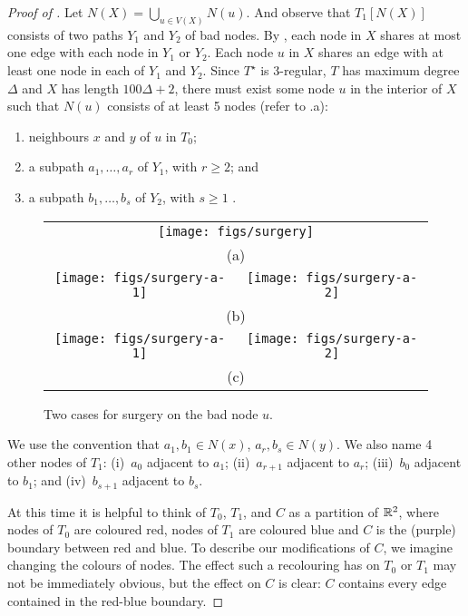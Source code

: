 \documentclass{patmorin}
\newcommand{\dual}[1]{{#1}^\star}
\begin{document}
\begin{proof}[Proof of ]
Let $N(X)=\bigcup_{u\in V(X)} N(u)$.  And observe that
$T_1[N(X)]$ consists of two paths $Y_1$ and $Y_2$ of bad nodes.
By , each node in $X$ shares at most one edge
with each node in $Y_1$ or $Y_2$.  Each node $u$ in $X$ shares an edge
with at least one node in each of $Y_1$ and $Y_2$.  Since $\dual{T}$
is 3-regular, $T$ has maximum degree $\Delta$ and $X$ has length
$100\Delta+2$, there must exist some node $u$ in the interior of $X$
such that $N(u)$ consists of at least 5 nodes (refer to .a):
\begin{enumerate}
   \item neighbours $x$ and $y$ of $u$ in $T_0$;
   \item a subpath $a_1,\ldots,a_r$ of $Y_1$, with $r\ge 2$; and
   \item a subpath $b_1,\ldots,b_s$ of $Y_2$, with $s\ge 1$ \enspace .
\end{enumerate}
\begin{figure}
   \begin{center}
   \begin{tabular}{cc}
    \multicolumn{2}{c}{\texttt{[image: figs/surgery]}} \\
    \multicolumn{2}{c}{(a)} \\[2em]
    \texttt{[image: figs/surgery-a-1]} & \texttt{[image: figs/surgery-a-2]} \\ 
    \multicolumn{2}{c}{(b)} \\[2em]
    \texttt{[image: figs/surgery-a-1]} & \texttt{[image: figs/surgery-a-2]} \\ 
    \multicolumn{2}{c}{(c)}
   \end{tabular}
   \end{center}
   \caption{Two cases for surgery on the bad node $u$.}
\end{figure}
We use the convention that $a_1,b_1\in N(x)$, $a_r,b_s\in N(y)$. We
also name 4 other nodes of $T_1$: (i)~$a_0$ adjacent to $a_1$;
(ii)~$a_{r+1}$ adjacent to $a_r$; (iii)~$b_0$ adjacent to $b_1$; and
(iv)~$b_{s+1}$ adjacent to $b_s$.

At this time it is helpful to think of $T_0$, $T_1$, and $C$ as a
partition of $\mathbb{R}^2$, where nodes of $T_0$ are coloured red, nodes of $T_1$
are coloured blue and $C$ is the (purple) boundary between red and blue.
To describe our modifications of $C$, we imagine changing the colours
of nodes.  The effect such a recolouring has on $T_0$ or $T_1$ may not
be immediately obvious, but the effect on $C$ is clear: $C$ contains
every edge contained in the red-blue boundary.


\end{proof}
\end{document}
